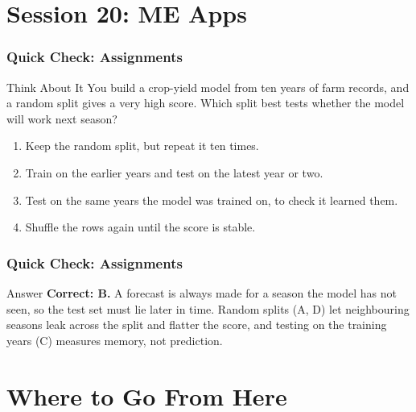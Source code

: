 \section[ME Apps]{Session 20: ME Apps}


% 
% 
% 
% 







\begin{frame}[fragile]\frametitle{Quick Check: Assignments}
\begin{block}{Think About It}
You build a crop-yield model from ten years of farm records, and a random split gives a very high score.
Which split best tests whether the model will work next season?
\begin{enumerate}
  \item[A.] Keep the random split, but repeat it ten times.
  \item[B.] Train on the earlier years and test on the latest year or two.
  \item[C.] Test on the same years the model was trained on, to check it learned them.
  \item[D.] Shuffle the rows again until the score is stable.
\end{enumerate}
\end{block}
\end{frame}

\begin{frame}[fragile]\frametitle{Quick Check: Assignments}
\begin{block}{Answer}
\textbf{Correct: B.} A forecast is always made for a season the model has not seen, so the test set must lie
later in time. Random splits (A, D) let neighbouring seasons leak across the split and flatter the score, and
testing on the training years (C) measures memory, not prediction.
\end{block}
\end{frame}

\section[Career]{Where to Go From Here}

